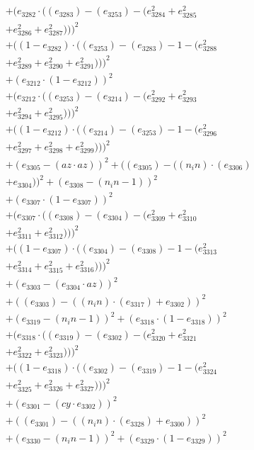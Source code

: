 \documentclass[10pt, a4paper]{article}
\begin{document}
\begin{align*}
& + (e_{3282}  \cdot  ((e_{3283}) - (e_{3253}) - (e_{3284}^{2} + e_{3285}^{2} \\
& + e_{3286}^{2} + e_{3287}^{2})))^{2} \\
& + ((1 - e_{3282})  \cdot  ((e_{3253}) - (e_{3283}) - 1 - (e_{3288}^{2} \\
& + e_{3289}^{2} + e_{3290}^{2} + e_{3291}^{2})))^{2} \\
& + (e_{3212}  \cdot  (1 - e_{3212}))^{2} \\
& + (e_{3212}  \cdot  ((e_{3253}) - (e_{3214}) - (e_{3292}^{2} + e_{3293}^{2} \\
& + e_{3294}^{2} + e_{3295}^{2})))^{2} \\
& + ((1 - e_{3212})  \cdot  ((e_{3214}) - (e_{3253}) - 1 - (e_{3296}^{2} \\
& + e_{3297}^{2} + e_{3298}^{2} + e_{3299}^{2})))^{2} \\
& + (e_{3305} - (az  \cdot  az))^{2} + ((e_{3305}) - ((n_in)  \cdot  (e_{3306}) \\
& + e_{3304}))^{2} + (e_{3308} - (n_in - 1))^{2} \\
& + (e_{3307}  \cdot  (1 - e_{3307}))^{2} \\
& + (e_{3307}  \cdot  ((e_{3308}) - (e_{3304}) - (e_{3309}^{2} + e_{3310}^{2} \\
& + e_{3311}^{2} + e_{3312}^{2})))^{2} \\
& + ((1 - e_{3307})  \cdot  ((e_{3304}) - (e_{3308}) - 1 - (e_{3313}^{2} \\
& + e_{3314}^{2} + e_{3315}^{2} + e_{3316}^{2})))^{2} \\
& + (e_{3303} - (e_{3304}  \cdot  az))^{2} \\
& + ((e_{3303}) - ((n_in)  \cdot  (e_{3317}) + e_{3302}))^{2} \\
& + (e_{3319} - (n_in - 1))^{2} + (e_{3318}  \cdot  (1 - e_{3318}))^{2} \\
& + (e_{3318}  \cdot  ((e_{3319}) - (e_{3302}) - (e_{3320}^{2} + e_{3321}^{2} \\
& + e_{3322}^{2} + e_{3323}^{2})))^{2} \\
& + ((1 - e_{3318})  \cdot  ((e_{3302}) - (e_{3319}) - 1 - (e_{3324}^{2} \\
& + e_{3325}^{2} + e_{3326}^{2} + e_{3327}^{2})))^{2} \\
& + (e_{3301} - (cy  \cdot  e_{3302}))^{2} \\
& + ((e_{3301}) - ((n_in)  \cdot  (e_{3328}) + e_{3300}))^{2} \\
& + (e_{3330} - (n_in - 1))^{2} + (e_{3329}  \cdot  (1 - e_{3329}))^{2} \\

\end{align*}
\end{document}
